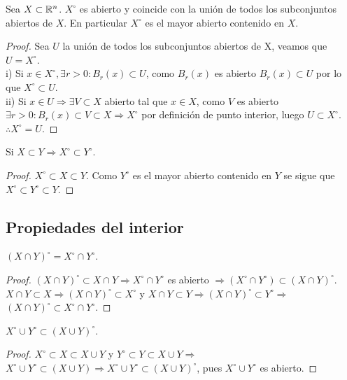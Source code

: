 \begin{prop}
  Sea \(X \subset \mathbb{R}^n\). \(X^{\circ}\) es abierto y coincide con la unión de todos los subconjuntos abiertos de \(X\). En particular \(X^{\circ}\) es el mayor abierto contenido en \(X\).
  \begin{proof}
    Sea \(U\) la unión de todos los subconjuntos abiertos de X, veamos que \(U = X^{\circ}\). \\
    i) Si \(x \in X^{\circ}, \exists r > 0 : B_r(x) \subset U\), como \(B_r(x)\) es abierto \(B_r(x) \subset U\) por lo que \(X^{\circ} \subset U\). \\
    ii) Si \(x \in U \Rightarrow \exists V \subset X\) abierto tal que \(x \in X\), como \(V\) es abierto \(\exists r > 0 : B_r(x) \subset V \subset X \Rightarrow X^{\circ}\) por definición de punto interior, luego \(U \subset X^{\circ}\). \\
    \(\therefore X^{\circ} = U\).
  \end{proof}
\end{prop}

\begin{corollary}
  Si \(X \subset Y \Rightarrow X^{\circ} \subset Y^{\circ}\).
  \begin{proof}
    \(X^{\circ} \subset X \subset Y\). Como \(Y^{\circ}\) es el mayor abierto contenido en \(Y\) se sigue que \(X^{\circ} \subset Y^{\circ} \subset Y\).
  \end{proof}
\end{corollary}

\subsection{Propiedades del interior}

\begin{prop}
  \((X \cap Y)^{\circ} = X^{\circ} \cap Y^{\circ}\).
  \begin{proof}
    \((X \cap Y)^{\circ} \subset X \cap Y \Rightarrow X^{\circ} \cap Y^{\circ}\) es abierto \(\Rightarrow (X^{\circ} \cap Y^{\circ}) \subset (X \cap Y)^{\circ}\). \\
    \(X \cap Y \subset X \Rightarrow (X \cap Y)^{\circ} \subset X^{\circ}\) y \(X \cap Y \subset Y \Rightarrow (X \cap Y)^{\circ} \subset Y^{\circ} \Rightarrow\) \\
    \((X \cap Y)^{\circ} \subset X^{\circ} \cap Y^{\circ}\).
  \end{proof}
\end{prop}

\begin{prop}
  \(X^{\circ} \cup Y^{\circ} \subset (X \cup Y)^{\circ}\).
  \begin{proof}
    \(X^{\circ} \subset X \subset X \cup Y\) y \(Y^{\circ} \subset Y \subset X \cup Y \Rightarrow\) \\
    \(X^{\circ} \cup Y^{\circ} \subset (X \cup Y) \Rightarrow X^{\circ} \cup Y^{\circ} \subset (X \cup Y)^{\circ}\), pues \(X^{\circ} \cup Y^{\circ}\) es abierto.
  \end{proof}
\end{prop}


